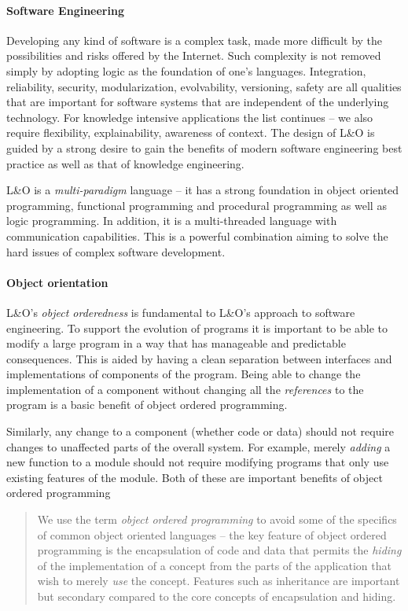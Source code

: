 \paragraph{Software Engineering}

Developing any kind of software is a complex task, made more difficult by the possibilities and risks offered by the Internet. Such complexity is not removed simply by adopting logic as the foundation of one's languages. Integration, reliability, security, modularization, evolvability, versioning, safety are all qualities that are important for software systems that are independent of the underlying technology. For knowledge intensive applications the list continues -- we also require flexibility, explainability, awareness of context. The design of L&O is guided by a strong desire to gain the benefits of modern software engineering best practice as well as that of knowledge engineering. 

L&O is a \textit{multi-paradigm} language -- it has a strong foundation in object oriented programming, functional programming and procedural programming as well as logic programming. In addition, it is a multi-threaded language with communication capabilities. This is a powerful combination aiming to solve the hard issues of complex software development.

\paragraph{Object orientation}
L&O's \textit{object orderedness} is fundamental to L&O's approach to  software engineering.  To support the evolution of programs it is important to be able to modify a large program in a way that has manageable and predictable consequences. This is aided by having a clean separation between interfaces and implementations of components of the program. Being able to change the implementation of a component without changing all the \textit{references} to the program is a basic benefit of object ordered programming.

Similarly, any change to a component (whether code or data) should not require changes to unaffected parts of the overall system. For example, merely \textit{adding} a new function to a module should not require modifying programs that only use existing features of the module. Both of these are important benefits of object ordered programming

\begin{quote}
We use the term \textit{object ordered programming} to avoid some of the specifics of common object oriented languages -- the key feature of object ordered programming is the encapsulation of code and data that permits the \textit{hiding} of the implementation of a concept from the parts of the application that wish to merely \textit{use} the concept. Features such as inheritance are important but secondary compared to the core concepts of encapsulation and hiding.
\end{quote}

